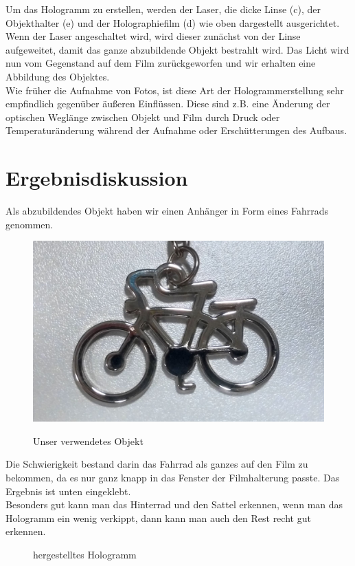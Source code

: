 Um das Hologramm zu erstellen, werden der Laser, die dicke Linse (c), der Objekthalter (e) und der Holographiefilm (d) wie oben dargestellt ausgerichtet. \\
Wenn der Laser angeschaltet wird, wird dieser zunächst von der Linse aufgeweitet, damit das ganze abzubildende Objekt bestrahlt wird. Das Licht wird nun vom Gegenstand auf dem Film zurückgeworfen und wir erhalten eine Abbildung des Objektes. \\
Wie früher die Aufnahme von Fotos, ist diese Art der Hologrammerstellung sehr empfindlich gegenüber äußeren Einflüssen. Diese sind z.B. eine Änderung der optischen Weglänge zwischen Objekt und Film durch Druck oder Temperaturänderung während der Aufnahme oder Erschütterungen des Aufbaus. 


\section{Ergebnisdiskussion}

Als abzubildendes Objekt haben wir einen Anhänger in Form eines Fahrrads genommen.

\begin{figure}[h]
	\includegraphics[scale=0.25]{Objekt.jpg}
	\label{Objekt}
	\caption{Unser verwendetes Objekt}
\end{figure}


Die Schwierigkeit bestand darin das Fahrrad als ganzes auf den Film zu bekommen, da es nur ganz knapp in das Fenster der Filmhalterung passte. Das Ergebnis ist unten eingeklebt. \\
Besonders gut kann man das Hinterrad und den Sattel erkennen, wenn man das Hologramm ein wenig verkippt, dann kann man auch den Rest recht gut erkennen.

\begin{figure}[h]
	\vspace{6cm}
	\label{Hologramm}
	\caption{hergestelltes Hologramm}
\end{figure}




